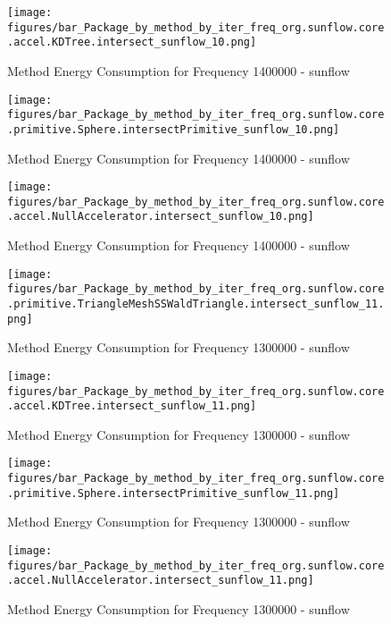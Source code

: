 				\begin{figure}[H]
				\centering
				\texttt{[image: figures/bar\_Package\_by\_method\_by\_iter\_freq\_org.sunflow.core.accel.KDTree.intersect\_sunflow\_10.png]}
				\caption{Method Energy Consumption for Frequency 1400000 - sunflow}				
				\end{figure}				
				
				\begin{figure}[H]
				\centering
				\texttt{[image: figures/bar\_Package\_by\_method\_by\_iter\_freq\_org.sunflow.core.primitive.Sphere.intersectPrimitive\_sunflow\_10.png]}
				\caption{Method Energy Consumption for Frequency 1400000 - sunflow}				
				\end{figure}				
				
				\begin{figure}[H]
				\centering
				\texttt{[image: figures/bar\_Package\_by\_method\_by\_iter\_freq\_org.sunflow.core.accel.NullAccelerator.intersect\_sunflow\_10.png]}
				\caption{Method Energy Consumption for Frequency 1400000 - sunflow}				
				\end{figure}				
				
				\begin{figure}[H]
				\centering
				\texttt{[image: figures/bar\_Package\_by\_method\_by\_iter\_freq\_org.sunflow.core.primitive.TriangleMeshSSWaldTriangle.intersect\_sunflow\_11.png]}
				\caption{Method Energy Consumption for Frequency 1300000 - sunflow}				
				\end{figure}				
				
				\begin{figure}[H]
				\centering
				\texttt{[image: figures/bar\_Package\_by\_method\_by\_iter\_freq\_org.sunflow.core.accel.KDTree.intersect\_sunflow\_11.png]}
				\caption{Method Energy Consumption for Frequency 1300000 - sunflow}				
				\end{figure}				
				
				\begin{figure}[H]
				\centering
				\texttt{[image: figures/bar\_Package\_by\_method\_by\_iter\_freq\_org.sunflow.core.primitive.Sphere.intersectPrimitive\_sunflow\_11.png]}
				\caption{Method Energy Consumption for Frequency 1300000 - sunflow}				
				\end{figure}				
				
				\begin{figure}[H]
				\centering
				\texttt{[image: figures/bar\_Package\_by\_method\_by\_iter\_freq\_org.sunflow.core.accel.NullAccelerator.intersect\_sunflow\_11.png]}
				\caption{Method Energy Consumption for Frequency 1300000 - sunflow}				
				\end{figure}				
				
